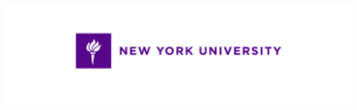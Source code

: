 \documentclass[final]{beamer}
\newlength{\onecolwid}
\begin{document}
\begin{frame}[t]
\begin{columns}[t]
\begin{column}{\onecolwid}






\begin{center}
\includegraphics[width=0.8\linewidth]{nyu_long.png}
\end{center}


\end{column} %

\end{columns} %

\end{frame} %
\end{document}
